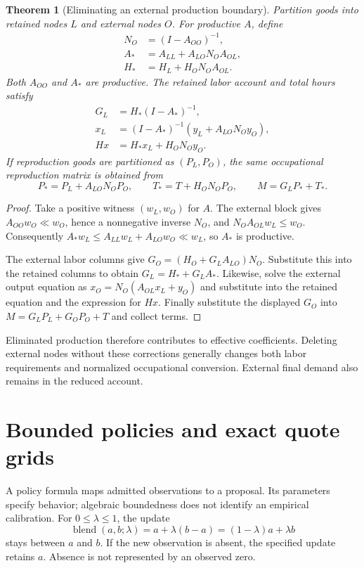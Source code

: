 \documentclass[11pt,a4paper]{article}
\newtheorem{theorem}{Theorem}[section]
\begin{document}
\begin{theorem}[Eliminating an external production boundary]
Partition goods into retained nodes $L$ and external nodes $O$. For productive $A$, define
\begin{equation}
\begin{aligned}
N_O&=(I-A_{OO})^{-1},\\
A_*&=A_{LL}+A_{LO}N_OA_{OL},\\
H_*&=H_L+H_ON_OA_{OL}.
\end{aligned}
\end{equation}
Both $A_{OO}$ and $A_*$ are productive. The retained labor account and total hours satisfy
\begin{equation}
\begin{aligned}
G_L&=H_*(I-A_*)^{-1},\\
x_L&=(I-A_*)^{-1}(y_L+A_{LO}N_Oy_O),\\
Hx&=H_*x_L+H_ON_Oy_O.
\end{aligned}
\end{equation}
If reproduction goods are partitioned as $(P_L,P_O)$, the same occupational reproduction matrix is obtained from
\begin{equation}
P_*=P_L+A_{LO}N_OP_O,\qquad
T_*=T+H_ON_OP_O,\qquad M=G_LP_*+T_*.
\end{equation}
\end{theorem}
\begin{proof}
Take a positive witness $(w_L,w_O)$ for $A$. The external block gives $A_{OO}w_O\ll w_O$, hence a nonnegative inverse $N_O$, and $N_OA_{OL}w_L\leq w_O$. Consequently $A_*w_L\leq A_{LL}w_L+A_{LO}w_O\ll w_L$, so $A_*$ is productive.

The external labor columns give $G_O=(H_O+G_LA_{LO})N_O$. Substitute this into the retained columns to obtain $G_L=H_*+G_LA_*$. Likewise, solve the external output equation as $x_O=N_O(A_{OL}x_L+y_O)$ and substitute into the retained equation and the expression for $Hx$. Finally substitute the displayed $G_O$ into $M=G_LP_L+G_OP_O+T$ and collect terms.
\end{proof}

Eliminated production therefore contributes to effective coefficients. Deleting external nodes without these corrections generally changes both labor requirements and normalized occupational conversion. External final demand also remains in the reduced account.

\section{Bounded policies and exact quote grids}
A policy formula maps admitted observations to a proposal. Its parameters specify behavior; algebraic boundedness does not identify an empirical calibration. For $0\leq\lambda\leq1$, the update
\begin{equation}
\operatorname{blend}(a,b;\lambda)=a+\lambda(b-a)
=(1-\lambda)a+\lambda b
\end{equation}
stays between $a$ and $b$. If the new observation is absent, the specified update retains $a$. Absence is not represented by an observed zero.
\end{document}
